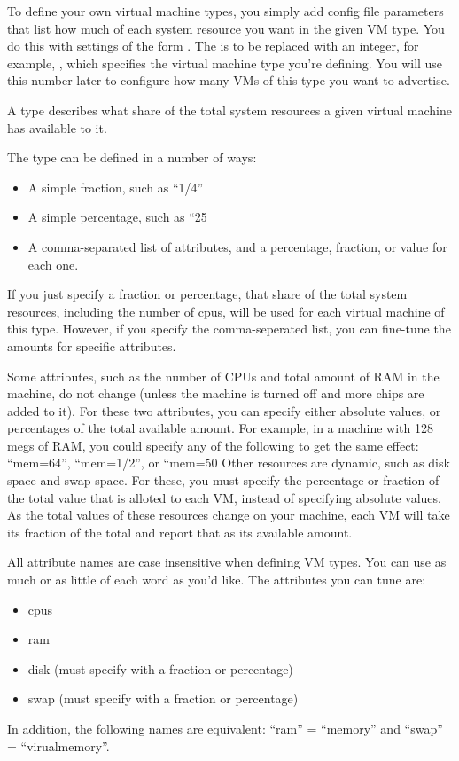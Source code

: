 To define your own virtual machine types, you simply add config file
parameters that list how much of each system resource you want in the
given VM type.  You do this with settings of the form
.
The  is to be replaced with an integer, for example, 
, which specifies the virtual 
machine type you're defining.
You will use this number later to configure how many VMs of this type
you want to advertise.

A type describes what share of the total system resources a given
virtual machine has available to it.

The type can be defined in a number of ways:
\begin{itemize}
  \item A simple fraction, such as ``1/4''
  \item A simple percentage, such as ``25%
  \item A comma-separated list of attributes, and a percentage,
	fraction, or value for each one.
\end{itemize}
If you just specify a fraction or percentage, that share of the total
system resources, including the number of cpus, will be used for each
virtual machine of this type.
However, if you specify the comma-seperated list, you can fine-tune
the amounts for specific attributes.

Some attributes, such as the number of CPUs and total amount of RAM in
the machine, do not change (unless the machine is turned off and more
chips are added to it).
For these two attributes, you can specify either absolute values, or
percentages of the total available amount.  
For example, in a machine with 128 megs of RAM, you could specify any
of the following to get the same effect: ``mem=64'', ``mem=1/2'', or
``mem=50%
Other resources are dynamic, such as disk space and swap space.
For these, you must specify the percentage or fraction of the total
value that is alloted to each VM, instead of specifying absolute values.
As the total values of these resources change on your machine, each
VM will take its fraction of the total and report that as its
available amount.

All attribute names are case insensitive when defining VM types.
You can use as much or as little of each word as you'd like.
The attributes you can tune are:
\begin{itemize}
  \item cpus
  \item ram
  \item disk (must specify with a fraction or percentage)
  \item swap (must specify with a fraction or percentage)
\end{itemize}
In addition, the following names are equivalent: ``ram'' = ``memory''
and ``swap'' = ``virualmemory''.


